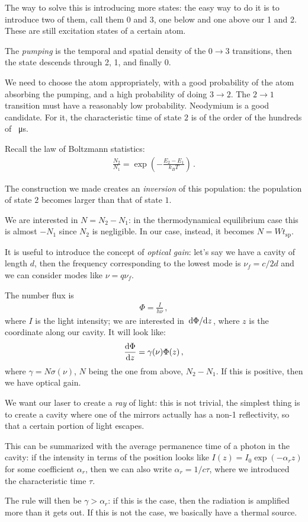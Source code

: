 \documentclass[main.tex]{subfiles}
\begin{document}
The way to solve this is introducing more states: the easy way to do it is to introduce two of them, call them 0 and 3, one below and one above our 1 and 2. These are still excitation states of a certain atom. 

The \emph{pumping} is the temporal and spatial density of the \(0 \to 3\) transitions, then the state descends through 2, 1, and finally 0. 

We need to choose the atom appropriately, with a good probability of the atom absorbing the pumping, and a high probability of doing \(3 \to 2\). The \(2 \to 1\) transition must have a reasonably low probability. 
Neodymium is a good candidate. For it, the characteristic time of state \(2\) is of the order of the hundreds of \SI{}{\micro \second}. 

Recall the law of Boltzmann statistics: 
%
\begin{align}
\frac{N_2 }{N_1 } = \exp(-\frac{E_2 - E_1 }{k_B T})
\,.
\end{align}

The construction we made creates an \emph{inversion} of this population: the population of state \(2\) becomes larger than that of state \(1\). 

We are interested in \(N = N_2 - N_1 \): in the thermodynamical equilibrium case this is almost \(-N_1 \) since \(N_2 \) is negligible. 
In our case, instead, it becomes \(N = W t _{\text{sp}}\). 

It is useful to introduce the concept of \emph{optical gain}: 
let's say we have a cavity of length \(d\), then the frequency corresponding to the lowest mode is \(\nu_{f} = c / 2d \) and we can consider modes like \(\nu = q \nu_{f}\). 

The number flux is 
%
\begin{align}
\Phi = \frac{I}{h \nu }
\,,
\end{align}
%
where \(I\) is the light intensity; 
 we are interested in \(\dv*{\Phi }{z}\), where \(z \) is the coordinate along our cavity. 
 It will look like: 
 \begin{align}
 \dv{\Phi }{z} = \gamma(\nu ) \Phi(z) 
 \,,
 \end{align}
where \(\gamma = N \sigma (\nu )\), \(N\) being the one from above, \(N_2 - N_1 \). If this is positive, then we have optical gain. 

We want our laser to create a \emph{ray} of light: this is not trivial, the simplest thing is to create a cavity where one of the mirrors actually has a non-1 reflectivity, so that a certain portion of light escapes. 

This can be summarized with the average permanence time of a photon in the cavity: 
if the intensity in terms of the position looks like \(I(z)= I_0 \exp(-\alpha_{r} z)\) for some coefficient \(\alpha_{r}\), then we can also write \(\alpha_{r} = 1 / c \tau \), where we introduced the characteristic time \(\tau \).  

The rule will then be \(\gamma > \alpha_{r}\): if this is the case, then the radiation is amplified more than it gets out. 
If this is not the case, we basically have a thermal source. 
\end{document}
